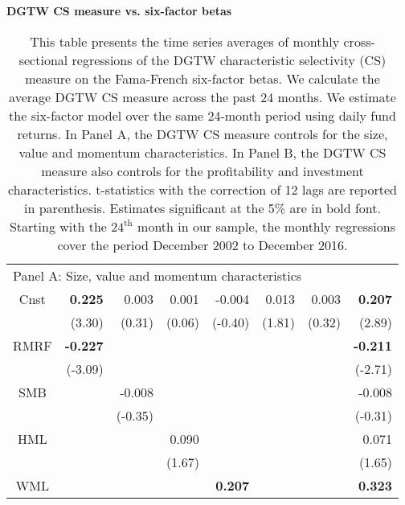 \begin{singlespacing}
\begin{table}[H]
\setlength{\tabcolsep}{23pt}
\centering
\small
{\captionsetup{justification=centering,singlelinecheck=off}
\caption{ \bfseries DGTW CS measure vs. six-factor betas} \label{table10}}
\caption*{This table presents the time series averages of monthly cross-sectional regressions of the DGTW characteristic selectivity (CS) measure on the Fama-French six-factor betas. We calculate the average DGTW CS measure across the past 24 months. We estimate the six-factor model over the same 24-month period using daily fund returns. In Panel A, the DGTW CS measure controls for the size, value and momentum characteristics. In Panel B, the DGTW CS measure also controls for the profitability and investment characteristics. \citet{fama1973risk} t-statistics with the \citet{newey1986simple} correction of 12 lags are reported in parenthesis. Estimates significant at the 5\% are in bold font. Starting with the $24^{\text{th}}$ month in our sample, the monthly regressions cover the period December 2002 to December 2016.}
\setlength{\tabcolsep}{14pt}
\label{my-label}
\begin{tabular}{crrrrrrr}
\hline
\multicolumn{8}{l}{Panel A: Size, value and momentum characteristics}                                                     \\
Cnst & \textbf{0.225}  & 0.003   & 0.001  & -0.004         & 0.013          & 0.003  & \textbf{0.207}  \\
     & (3.30)          & (0.31)  & (0.06) & (-0.40)        & (1.81)         & (0.32) & (2.89)          \\
RMRF & \textbf{-0.227} &         &        &                &                &        & \textbf{-0.211} \\
     & (-3.09)         &         &        &                &                &        & (-2.71)         \\
SMB  &                 & -0.008  &        &                &                &        & -0.008          \\
     &                 & (-0.35) &        &                &                &        & (-0.31)         \\
HML  &                 &         & 0.090  &                &                &        & 0.071           \\
     &                 &         & (1.67) &                &                &        & (1.65)          \\
WML  &                 &         &        & \textbf{0.207} &                &        & \textbf{0.323}  \\

\end{tabular}
\end{table}
\end{singlespacing}
